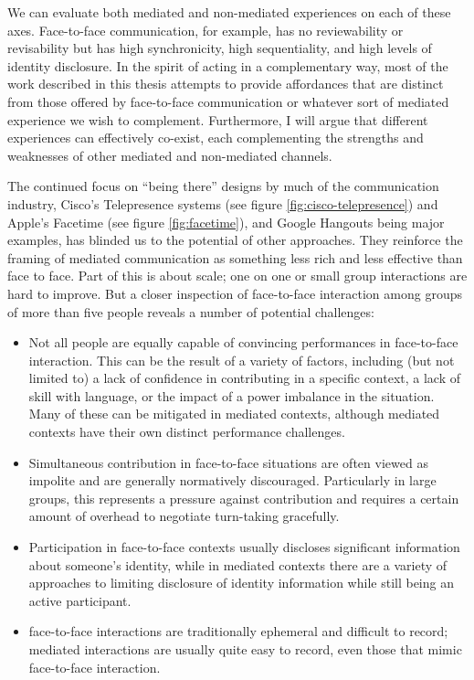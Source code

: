 We can evaluate both mediated and non-mediated experiences on each of these axes. Face-to-face communication, for example, has no reviewability or revisability but has high synchronicity, high sequentiality, and high levels of identity disclosure. In the spirit of acting in a complementary way, most of the work described in this thesis attempts to provide affordances that are distinct from those offered by face-to-face communication or whatever sort of mediated experience we wish to complement. Furthermore, I will argue that different experiences can effectively co-exist, each complementing the strengths and weaknesses of other mediated and non-mediated channels.

The continued focus on ``being there'' designs by much of the communication industry, Cisco's Telepresence systems (see figure \ref{fig:cisco-telepresence}) and Apple's Facetime (see figure \ref{fig:facetime}), and Google Hangouts being major examples, has blinded us to the potential of other approaches. They reinforce the framing of mediated communication as something less rich and less effective than face to face. Part of this is about scale; one on one or small group interactions are hard to improve. But a closer inspection of face-to-face interaction among groups of more than five people reveals a number of potential challenges:


\begin{itemize}
\item Not all people are equally capable of convincing performances in face-to-face interaction. This can be the result of a variety of factors, including (but not limited to) a lack of confidence in contributing in a specific context, a lack of skill with language, or the impact of a power imbalance in the situation. Many of these can be mitigated in mediated contexts\citep{Siegel:1986ve}, although mediated contexts have their own distinct performance challenges.
\item Simultaneous contribution in face-to-face situations are often viewed as impolite and are generally normatively discouraged. Particularly in large groups, this represents a pressure against contribution and requires a certain amount of overhead to negotiate turn-taking gracefully.
\item Participation in face-to-face contexts usually discloses significant information about someone's identity, while in mediated contexts there are a variety of approaches to limiting disclosure of identity information while still being an active participant.
\item face-to-face interactions are traditionally ephemeral and difficult to record; mediated interactions are usually quite easy to record, even those that mimic face-to-face interaction. 
\end{itemize}



